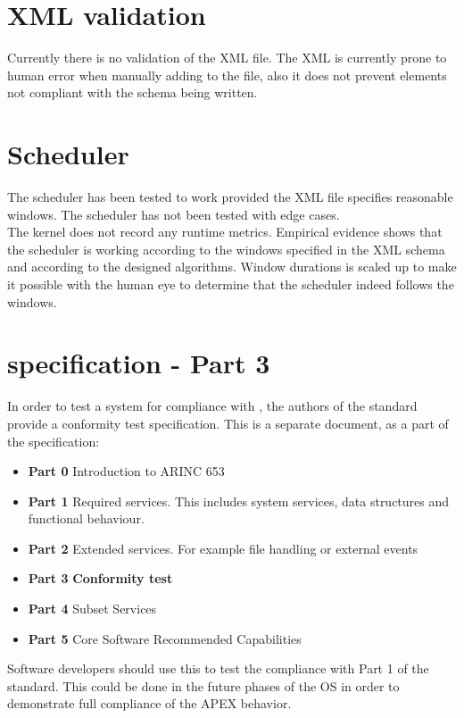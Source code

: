 \section{XML validation}
Currently there is no validation of the XML file.
The XML is currently prone to human error when manually
adding to the file, also it does not prevent elements
not compliant with the schema being written.


\section{Scheduler}
The scheduler has been tested to work provided the XML file specifies reasonable
windows. The scheduler has not been tested with edge cases.\\
The kernel does not record any runtime metrics. Empirical
evidence shows that the scheduler is working according to the windows specified in the
XML schema and according to the designed algorithms. Window durations is
scaled up to make it possible with the human eye to determine that the scheduler
indeed follows the windows.


\section{\arinc{} specification - Part 3}
In order to test a system for compliance with \arinc{},
the authors of the standard provide a conformity test
specification. This is a separate document, as a part of the
\arinc{} specification:
\begin{itemize}
	\item\textbf{Part 0} Introduction to ARINC 653
	\item\textbf{Part 1} Required services. This includes system services,
	data structures and functional behaviour.
	\item\textbf{Part 2} Extended services. For example file handling or external events
	\item\textbf{Part 3} \textbf{Conformity test}
	\item\textbf{Part 4} Subset Services
	\item\textbf{Part 5} Core Software Recommended Capabilities
\end{itemize}

Software developers should use this to test the compliance with
Part 1 of the standard. This could be done in the future phases of the \OSname{} OS in order
to demonstrate full compliance of the APEX behavior.


